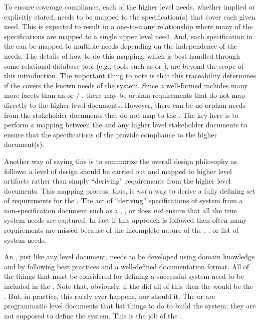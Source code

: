 To ensure coverage compliance, each of the higher level needs, whether implied or explicitly stated, needs to be mapped to the \SPS specification(s) that cover each given need.
This is expected to result in a one-to-many relationship where many of the \SPS specifications are mapped to a single upper level need.
And, each specification in the \SPS can be mapped to multiple needs depending on the independence of the needs.
The details of how to do this mapping, which is best handled through some relational database tool (e.g., \MBSE tools such as \DOORS or \CAMEO), are beyond the scope of this introduction.
The important thing to note is that this traceability determines if the \SPS covers the known needs of the system.
Since a well-formed \SPS includes many more facets than an \OCD or \SOW / \SOO, there may be orphan \SPS requirements that do not map directly to the higher level documents.
However, there can be no orphan needs from the stakeholder documents that do not map to the \SPS.
The key here is to perform a mapping between the \SPS and any higher level stakeholder documents to ensure that the specifications of the \SPS provide compliance to the higher document(s).


Another way of saying this is to summarize the overall design philosophy as follows: a level of design should be carried out and mapped to higher level artifacts rather than simply ``deriving'' requirements from the higher level documents.
This mapping process, thus, is {\em not} a way to derive a fully defining set of requirements for the \SPS.
The act of ``deriving'' specifications of system from a non-specification document such as a \OCD, \SOW, or \SOO does {\em not} ensure that all the true system needs are captured.
In fact if this approach is followed then often many requirements are missed because of the incomplete nature of the \OCD, \SOW, or \SOO list of system needs.


An \SPS, just like any level document, needs to be developed using domain knowledge and by following best practices and a well-defined documentation format.
All of the things that must be considered for defining a successful system need to be included in the \SPS.
Note that, obviously, if the \SOW did all of this then the \SOW would be the \SPS.
But, in practice, this rarely ever happens, nor should it.
The \SOW or \SOO are programmatic level documents that list things to do to build the system; they are not supposed to define the system.
This is the job of the \SPS.


